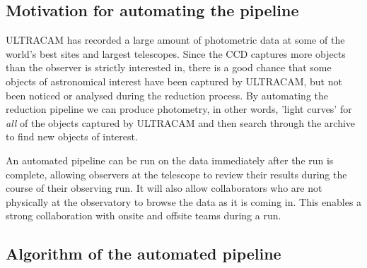 \subsection{Motivation for automating the pipeline}
ULTRACAM has recorded a large amount of photometric data at some of the world's best sites and largest telescopes. Since the CCD captures more objects than the observer is strictly interested in, there is a good chance that some objects of astronomical interest have been captured by ULTRACAM, but not been noticed or analysed during the reduction process. By automating the reduction pipeline we can produce photometry, in other words, 'light curves' for \emph{all} of the objects captured by ULTRACAM and then search through the archive to find new objects of interest. 

An automated pipeline can be run on the data immediately after the run is complete, allowing observers at the telescope to review their results during the course of their observing run. It will also allow collaborators who are not physically at the observatory to browse the data as it is coming in. This enables a strong collaboration with onsite and offsite teams during a run. 

\subsection{Algorithm of the automated pipeline} 

